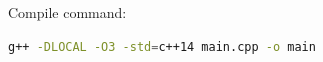 
Compile command:
\begin{lstlisting}[language=bash, backgroundcolor=\color{gray!6}]
g++ -DLOCAL -O3 -std=c++14 main.cpp -o main
\end{lstlisting}

